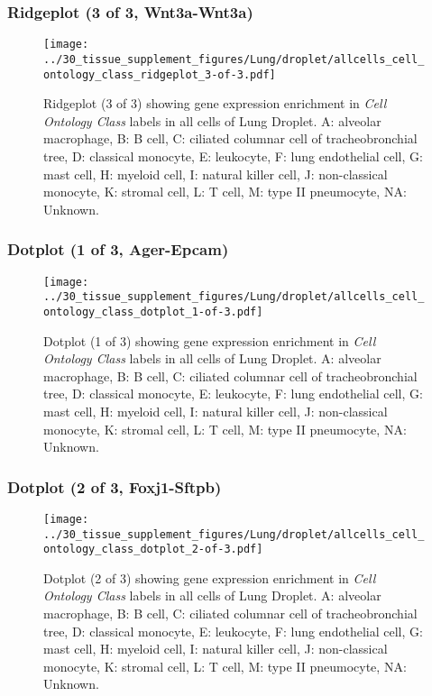 \clearpage

\subsubsection{Ridgeplot (3 of 3, Wnt3a-Wnt3a)}
\begin{figure}[h]
\centering
\texttt{[image: ../30\_tissue\_supplement\_figures/Lung/droplet/allcells\_cell\_ontology\_class\_ridgeplot\_3-of-3.pdf]}

\caption{ Ridgeplot (3 of 3)  showing gene expression enrichment in \emph{Cell Ontology Class} labels in all cells of Lung Droplet. A: alveolar macrophage, B: B cell, C: ciliated columnar cell of tracheobronchial tree, D: classical monocyte, E: leukocyte, F: lung endothelial cell, G: mast cell, H: myeloid cell, I: natural killer cell, J: non-classical monocyte, K: stromal cell, L: T cell, M: type II pneumocyte, NA: Unknown.}
\end{figure}


\clearpage

\subsubsection{Dotplot (1 of 3, Ager-Epcam)}
\begin{figure}[h]
\centering
\texttt{[image: ../30\_tissue\_supplement\_figures/Lung/droplet/allcells\_cell\_ontology\_class\_dotplot\_1-of-3.pdf]}

\caption{ Dotplot (1 of 3)  showing gene expression enrichment in \emph{Cell Ontology Class} labels in all cells of Lung Droplet. A: alveolar macrophage, B: B cell, C: ciliated columnar cell of tracheobronchial tree, D: classical monocyte, E: leukocyte, F: lung endothelial cell, G: mast cell, H: myeloid cell, I: natural killer cell, J: non-classical monocyte, K: stromal cell, L: T cell, M: type II pneumocyte, NA: Unknown.}
\end{figure}


\clearpage

\subsubsection{Dotplot (2 of 3, Foxj1-Sftpb)}
\begin{figure}[h]
\centering
\texttt{[image: ../30\_tissue\_supplement\_figures/Lung/droplet/allcells\_cell\_ontology\_class\_dotplot\_2-of-3.pdf]}

\caption{ Dotplot (2 of 3)  showing gene expression enrichment in \emph{Cell Ontology Class} labels in all cells of Lung Droplet. A: alveolar macrophage, B: B cell, C: ciliated columnar cell of tracheobronchial tree, D: classical monocyte, E: leukocyte, F: lung endothelial cell, G: mast cell, H: myeloid cell, I: natural killer cell, J: non-classical monocyte, K: stromal cell, L: T cell, M: type II pneumocyte, NA: Unknown.}
\end{figure}


